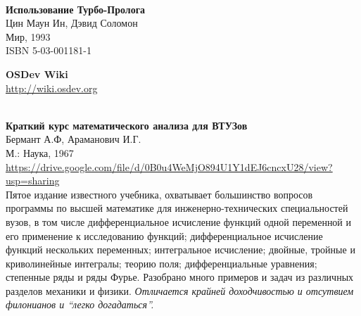 \begin{thebibliography}{99}
\ \\
\textbf{Использование Турбо-Пролога}\\
Цин Маун Ин, Дэвид Соломон\\
Мир, 1993\\ ISBN 5-03-001181-1




 \textbf{OSDev Wiki}\\
\url{http://wiki.osdev.org}



 \\
\textbf{Краткий курс математического анализа для ВТУЗов}\\
Бермант А.Ф, Араманович И.Г.\\
М.: Наука, 1967\\
\url{https://drive.google.com/file/d/0B0u4WeMjO894U1Y1dEJ6cncxU28/view?usp=sharing}\\

Пятое издание известного учебника, охватывает большинство вопросов программы по
высшей математике для инженерно-технических специальностей вузов, в том числе
дифференциальное исчисление функций одной переменной и его применение к
исследованию функций; дифференциальное исчисление функций нескольких переменных;
интегральное исчисление; двойные, тройные и криволинейные интегралы; теорию
поля; дифференциальные уравнения; степенные ряды и ряды Фурье. Разобрано много
примеров и задач из различных разделов механики и физики. \emph{Отличается
крайней доходчивостью и отсутвием филонианов и ``легко догадаться''.}


\end{thebibliography}
